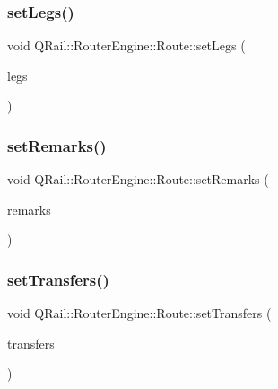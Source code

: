 \mbox{\label{classQRail_1_1RouterEngine_1_1Route_af472483ea371f0b6a0fc88c1ea303a49}} 
\subsubsection{\texorpdfstring{setLegs()}{setLegs()}}
{\footnotesize\ttfamily void Q\+Rail\+::\+Router\+Engine\+::\+Route\+::set\+Legs (\begin{DoxyParamCaption}\item[{const Q\+List$<$ \mbox{\hyperlink{classQRail_1_1RouterEngine_1_1RouteLeg}{Route\+Leg}} $\ast$ $>$ \&}]{legs }\end{DoxyParamCaption})}

\mbox{\label{classQRail_1_1RouterEngine_1_1Route_a4882ad008ab1eff92496fa76c2e15ee1}} 
\subsubsection{\texorpdfstring{setRemarks()}{setRemarks()}}
{\footnotesize\ttfamily void Q\+Rail\+::\+Router\+Engine\+::\+Route\+::set\+Remarks (\begin{DoxyParamCaption}\item[{const Q\+List$<$ \mbox{\hyperlink{classQRail_1_1AlertsEngine_1_1Message}{Q\+Rail\+::\+Alerts\+Engine\+::\+Message}} $\ast$ $>$ \&}]{remarks }\end{DoxyParamCaption})}

\mbox{\label{classQRail_1_1RouterEngine_1_1Route_a1e1f995678ad634713f038364e48d809}} 
\subsubsection{\texorpdfstring{setTransfers()}{setTransfers()}}
{\footnotesize\ttfamily void Q\+Rail\+::\+Router\+Engine\+::\+Route\+::set\+Transfers (\begin{DoxyParamCaption}\item[{const Q\+List$<$ \mbox{\hyperlink{classQRail_1_1RouterEngine_1_1Transfer}{Q\+Rail\+::\+Router\+Engine\+::\+Transfer}} $\ast$ $>$ \&}]{transfers }\end{DoxyParamCaption})}

